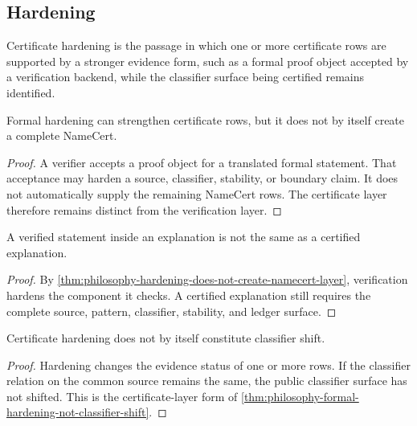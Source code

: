 \subsection{Hardening}
\label{subsec:philosophy-certification-hardening}

\begin{definition}
\label{def:philosophy-certificate-hardening}
Certificate hardening is the passage in which one or more certificate
rows are supported by a stronger evidence form, such as a formal proof
object accepted by a verification backend, while the classifier surface
being certified remains identified.
\end{definition}

\begin{theorem}
\label{thm:philosophy-hardening-does-not-create-namecert-layer}
Formal hardening can strengthen certificate rows, but it does not by
itself create a complete NameCert.
\end{theorem}
\begin{proof}
A verifier accepts a proof object for a translated formal statement. That
acceptance may harden a source, classifier, stability, or boundary claim.
It does not automatically supply the remaining NameCert rows. The
certificate layer therefore remains distinct from the verification layer.
\end{proof}

\begin{corollary}
\label{cor:philosophy-verified-components-not-whole-explanations}
A verified statement inside an explanation is not the same as a certified
explanation.
\end{corollary}
\begin{proof}
By \autoref{thm:philosophy-hardening-does-not-create-namecert-layer},
verification hardens the component it checks. A certified explanation
still requires the complete source, pattern, classifier, stability, and
ledger surface.
\end{proof}

\begin{theorem}
\label{thm:philosophy-certificate-hardening-not-classifier-shift}
Certificate hardening does not by itself constitute classifier shift.
\end{theorem}
\begin{proof}
Hardening changes the evidence status of one or more rows. If the
classifier relation on the common source remains the same, the public
classifier surface has not shifted. This is the certificate-layer form of
\autoref{thm:philosophy-formal-hardening-not-classifier-shift}.
\end{proof}

